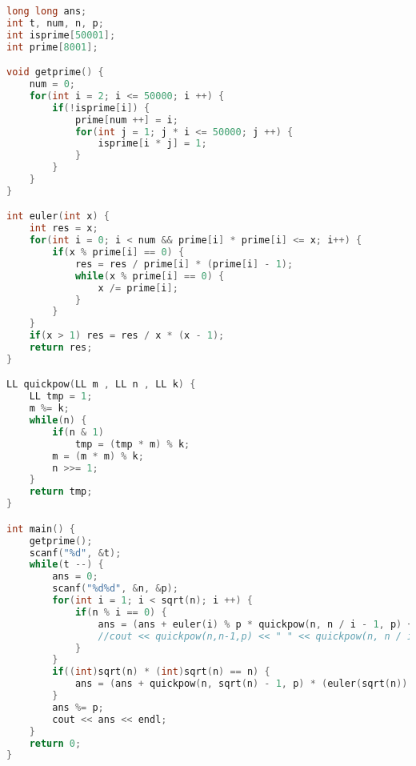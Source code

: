     \begin{lstlisting}[language=c++]
long long ans;
int t, num, n, p;
int isprime[50001];
int prime[8001];

void getprime() {
    num = 0;
    for(int i = 2; i <= 50000; i ++) {
        if(!isprime[i]) {
            prime[num ++] = i;
            for(int j = 1; j * i <= 50000; j ++) {
                isprime[i * j] = 1;
            }
        }
    }
}

int euler(int x) {
    int res = x;
    for(int i = 0; i < num && prime[i] * prime[i] <= x; i++) {
        if(x % prime[i] == 0) {
            res = res / prime[i] * (prime[i] - 1);
            while(x % prime[i] == 0) {
                x /= prime[i];
            }
        }
    }
    if(x > 1) res = res / x * (x - 1);
    return res;
}

LL quickpow(LL m , LL n , LL k) {
    LL tmp = 1; 
    m %= k;
    while(n) { 
        if(n & 1)
            tmp = (tmp * m) % k; 
        m = (m * m) % k;
        n >>= 1;
    } 
    return tmp;
} 

int main() {
    getprime();
    scanf("%d", &t);
    while(t --) {
        ans = 0;
        scanf("%d%d", &n, &p);
        for(int i = 1; i < sqrt(n); i ++) {
            if(n % i == 0) {
                ans = (ans + euler(i) % p * quickpow(n, n / i - 1, p) + euler(n / i) % p * quickpow(n, i - 1, p)) % p;
                //cout << quickpow(n,n-1,p) << " " << quickpow(n, n / i - 1, p) << " " << euler(i) << " " << euler(n / i) << endl;
            }
        }
        if((int)sqrt(n) * (int)sqrt(n) == n) {
            ans = (ans + quickpow(n, sqrt(n) - 1, p) * (euler(sqrt(n)) % p)) % p;
        }
        ans %= p;
        cout << ans << endl;
    }
    return 0;
}
    \end{lstlisting}
